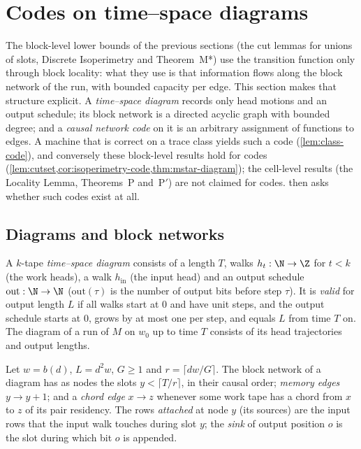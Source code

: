 \section{Codes on time--space diagrams}\label{sec:codes}

The block-level lower bounds of the previous sections (the cut lemmas for unions of slots, Discrete
Isoperimetry and Theorem~M*) use the transition function only through block locality: what they use is
that information flows along the block network of the run, with bounded capacity per edge. This section
makes that structure explicit. A \emph{time--space diagram} records only head motions and an output
schedule; its block network is a directed acyclic graph with bounded degree; and a \emph{causal network
code} on it is an arbitrary assignment of functions to edges. A machine that is correct on a trace class
yields such a code (\cref{lem:class-code}), and conversely these block-level results hold for codes
(\cref{lem:cutset,cor:isoperimetry-code,thm:mstar-diagram}); the cell-level results (the Locality Lemma,
Theorems~P and~P$'$) are not claimed for codes.  then asks whether such codes exist
at all.

\subsection{Diagrams and block networks}

\begin{definition}\label{def:diagram}
A $k$-tape \emph{time--space diagram} consists of a length $T$, walks $h_t:\N\to\Z$ for $t<k$ (the
work heads), a walk $h_{\mathrm{in}}$ (the input head) and an output schedule $\mathrm{out}:\N\to\N$
($\mathrm{out}(\tau)$ is the number of output bits before step $\tau$). It is \emph{valid} for output
length $L$ if all walks start at $0$ and have unit steps, and the output schedule starts at $0$,
grows by at most one per step, and equals $L$ from time $T$ on. The diagram of a run of $M$ on $w_0$
up to time $T$ consists of its head trajectories and output lengths.
\end{definition}

\begin{definition}\label{def:blocknet}
Let $w=b(d)$, $L=d^2w$, $G\ge1$ and $r=\lceil dw/G\rceil$. The block network of a diagram has as
nodes the slots $y<\lceil T/r\rceil$, in their causal order; \emph{memory edges} $y\to y+1$; and a
\emph{chord edge} $x\to z$ whenever some work tape has a chord from $x$ to $z$ of its pair
residency. The rows \emph{attached} at node $y$ (its sources) are the input rows that the input walk
touches during slot $y$; the \emph{sink} of output position $o$ is the slot during which bit $o$ is
appended.
\end{definition}

